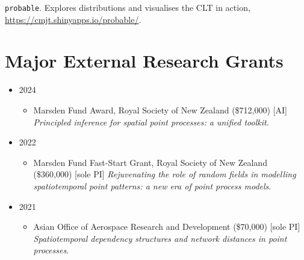 \documentclass[10pt,a4paper]{moderncv}
\begin{document}
\vspace{-3pt}

\texttt{probable}. Explores distributions and visualises the CLT in action, \url{https://cmjt.shinyapps.io/probable/}.\\

\newpage
\section{Major External Research Grants}

\vspace{6pt}
\begin{itemize}
  \item 2024
  \begin{itemize}
  \item Marsden Fund Award, Royal Society of New Zealand (\$712,000) [AI] \textit{Principled inference for spatial point processes: a unified toolkit}. 
  \end{itemize}
\item 2022
  \begin{itemize}
  \item Marsden Fund Fast-Start Grant, Royal Society of New Zealand (\$360,000) [sole PI] \textit{Rejuvenating the role of random fields in modelling spatiotemporal point patterns: a new era of point process models}.
  \end{itemize}
\item 2021
  \begin{itemize}
  \item Asian Office of Aerospace Research and Development (\$70,000) [sole PI] \textit{Spatiotemporal dependency structures and network distances in point processes}.
  \end{itemize}
\end{itemize}
\end{document}
